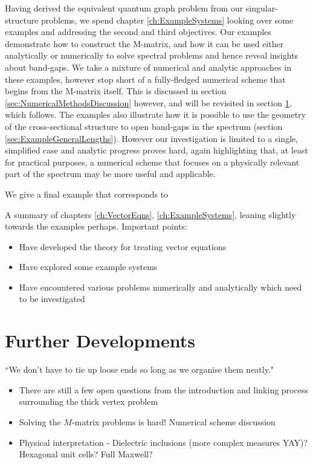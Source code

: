 Having derived the equivalent quantum graph problem from our singular-structure problems, we spend chapter \ref{ch:ExampleSystems} looking over some examples and addressing the second and third objectives.
Our examples demonstrate how to construct the M-matrix, and how it can be used either analytically or numerically to solve spectral problems and hence reveal insights about band-gaps.
We take a mixture of numerical and analytic approaches in these examples, however stop short of a fully-fledged numerical scheme that begins from the M-matrix itself.
This is discussed in section \ref{sec:NumericalMethodsDiscussion} however, and will be revisited in section \ref{sec:ConcFuture}, which follows.
The examples also illustrate how it is possible to use the geometry of the cross-sectional structure to open band-gaps in the spectrum (section \ref{sec:ExampleGeneralLengths}).
However our investigation is limited to a single, simplified case and analytic progress proves hard, again highlighting that, at least for practical purposes, a numerical scheme that focuses on a physically relevant part of the spectrum may be more useful and applicable. \newline

We give a final example that corresponds to 


A summary of chapters \ref{ch:VectorEqns}, \ref{ch:ExampleSystems}, leaning slightly towards the examples perhaps.
Important points:
\begin{itemize}
	\item Have developed the theory for treating vector equations
	\item Have explored some example systems
	\item Have encountered various problems numerically and analytically which need to be investigated
\end{itemize}

\section{Further Developments} \label{sec:ConcFuture}
``We don't have to tie up loose ends so long as we organise them neatly."
\begin{itemize}
	\item There are still a few open questions from the introduction and linking process surrounding the thick vertex problem
	\item Solving the $M$-matrix problems is hard! Numerical scheme discussion
	\item Physical interpretation - Dielectric inclusions (more complex measures YAY)? Hexagonal unit cells? Full Maxwell?
\end{itemize}
